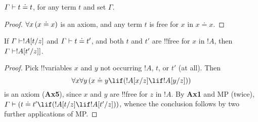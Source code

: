 \documentclass[../../include/open-logic-section]{subfiles}
\begin{document}


\begin{prop}
 $\Gamma \Proves t \doteq t$, for any term $t$ and set
  $\Gamma$.
\end{prop}

\begin{proof}
  $\lforall[x][(x \doteq x)]$ is an axiom, and any term $t$ is free for
  $x$ in $x \doteq x$. 
\end{proof}

\begin{prop}
  If $\Gamma \Proves \Subst{!A}{t}{z}$ and $\Gamma \Proves t \doteq
  t'$, and both $t$ and $t'$ are !!{free for} $x$ in $!A$, then
  $\Gamma \Proves \Subst{!A}{t'}{z}]$.  
\end{prop}

\begin{proof}
  Pick !!{variable}s $x$ and $y$ not occurring $!A$, $t$, or $t'$ (at
  all). Then 
  \[
  \lforall[x]\lforall[y][(x \doteq y \lif (\Subst{!A}{x}{z}] \lif
  \Subst{!A}{y}{z})) 
  \]
  is an axiom (\textbf{Ax5}), since $x$ and $y$ are !!{free for} $z$ in
  $!A$. By \textbf{Ax1} and MP (twice), $\Gamma \Proves (t \doteq t'
  \lif (\Subst{!A}{t}{z} \lif \Subst{!A}{t'}{z}))$, whence the
  conclusion follows by two further applications of MP. 
\end{proof}
\end{document}
